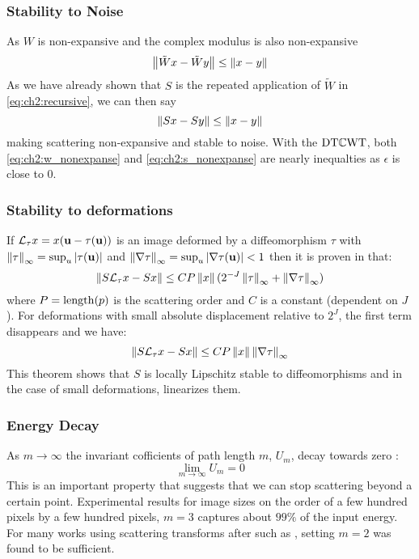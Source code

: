 \subsubsection{Stability to Noise}
As $W$ is non-expansive and the complex modulus is also non-expansive
\begin{equation}
  \left\lVert \tilde{W}x - \tilde{W}y \right\rVert \leq \left\lVert x-y \right\rVert \label{eq:ch2:w_nonexpanse}
\end{equation}
As we have already shown that $S$ is the repeated application of $\tilde{W}$ in
\eqref{eq:ch2:recursive}, we can then say
\begin{equation}
  \left\lVert Sx - Sy \right\rVert \leq \left\lVert x-y \right\rVert\label{eq:ch2:s_nonexpanse}
\end{equation}
making scattering non-expansive and stable to noise. With the $\mathrm{DT}\mathbb{C}\mathrm{WT}$, both
\eqref{eq:ch2:w_nonexpanse} and \eqref{eq:ch2:s_nonexpanse} are nearly
inequalties as $\epsilon$ is close to 0.

\subsubsection{Stability to deformations}
If $\mathcal{L}_\tau x = x(\mathbf{u} -\tau(\mathbf{u}))$ is an image deformed 
by a diffeomorphism $\tau$ with $\left\lVert \tau \right\rVert_\infty = \sup_u |\tau(\mathbf{u})|$
and $\left\lVert \nabla \tau \right\rVert_\infty = \sup_u |\nabla \tau(\mathbf{u})| < 1$ then it is
proven in \cite{mallat_group_2012} that:
%
\begin{equation}
  \left\lVert  S \mathcal{L}_{\tau}x  - S x \right\rVert \leq C P \left\lVert x \right\rVert
  (2^{-J}\left\lVert \tau \right\rVert_\infty + \left\lVert \nabla \tau \right\rVert_\infty ) 
\end{equation}
%
where $P = \mathrm{length}(p)$ is the scattering order and $C$ is a constant
(dependent on $J$). For deformations with small absolute displacement relative
to $2^J$, the first term disappears and we have:
\begin{equation}
  \left\lVert  S \mathcal{L}_{\tau}x  - S x \right\rVert \leq C P \left\lVert x \right\rVert \left\lVert \nabla \tau \right\rVert_\infty  \label{eq:stability}
\end{equation}
This theorem shows that $S$ is locally Lipschitz stable to diffeomorphisms and in
the case of small deformations, linearizes them.

\subsubsection{Energy Decay}
As $m \rightarrow \infty$ the invariant cofficients of path length $m$, $U_m$,
decay towards zero \cite{mallat_group_2012}:
\begin{equation}
  \lim_{m \rightarrow \infty} U_m = 0
\end{equation}
This is an important property that suggests that we can stop scattering beyond a
certain point. Experimental results \cite{bruna_invariant_2013} for 
image sizes on the order of a few hundred pixels by a few
hundred pixels, $m=3$ captures about $99\%$ of the input energy. For many works
using scattering transforms after \cite{bruna_invariant_2013} such as
\cite{oyallon_deep_2015, oyallon_hybrid_2017, oyallon_scaling_2017}, setting
$m=2$ was found to be sufficient.

